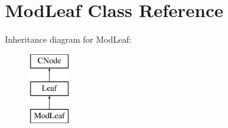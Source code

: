 \hypertarget{classModLeaf}{\section{\-Mod\-Leaf \-Class \-Reference}
\label{classModLeaf}
}
\-Inheritance diagram for \-Mod\-Leaf\-:\begin{figure}[H]
\begin{center}
\leavevmode
\includegraphics[height=3.000000cm]{classModLeaf}
\end{center}
\end{figure}
